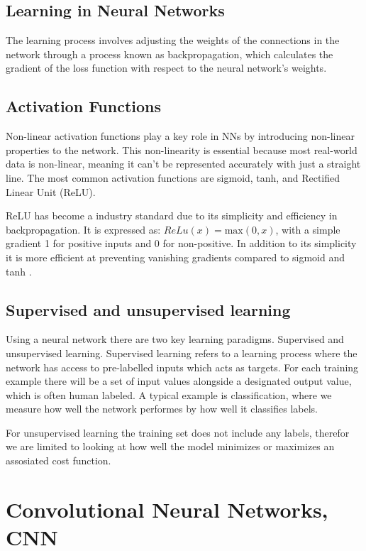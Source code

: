 \subsection{Learning in Neural Networks}
The learning process involves adjusting the weights of the connections in the network through a process known as backpropagation, which calculates the gradient of the loss function with respect to the neural network's weights.


\subsection{Activation Functions}
Non-linear activation functions play a key role in NNs by introducing non-linear properties to the network. This non-linearity is essential because most real-world data is non-linear, meaning it can't be represented accurately with just a straight line.
The most common activation functions are sigmoid, tanh, and Rectified Linear Unit (ReLU).


ReLU has become a industry standard due to its simplicity and efficiency in backpropagation. It is expressed as: $ReLu(x) = \text{max}(0, x)$, with a simple gradient 1 for positive inputs and 0 for non-positive. 
In addition to its simplicity it is more efficient at preventing vanishing gradients compared to sigmoid and tanh \cite{ReLuGrad}. 

\subsection{Supervised and unsupervised learning}
Using a neural network there are two key learning paradigms. Supervised and unsupervised learning. Supervised learning refers to a learning process where the network has access to pre-labelled inputs which acts as targets.
For each training example there will be a set of input values alongside a designated output value, which is often human labeled.
A typical example is classification, where we measure how well the network performes by how well it classifies labels.

For unsupervised learning the training set does not include any labels, therefor we are limited to looking at how well the model minimizes or maximizes an assosiated cost function.


\section{Convolutional Neural Networks, CNN}

